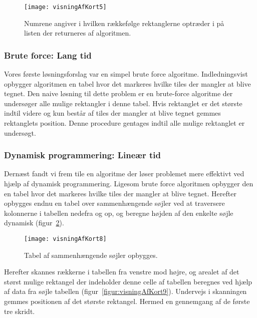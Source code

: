 \begin{figure}[h]
	\centering
	\texttt{[image: visningAfKort5]}
	\captionsetup{width=0.8\textwidth}
	\caption{Numrene angiver i hvilken rækkefølge rektanglerne optræder i på listen der returneres af algoritmen.}
	\label{figur:visningAfKort5}
\end{figure}

\subsubsection{Brute force: Lang tid}
\label{subsec:bruteForce}

Vores første løsningsforslag var en simpel brute force algoritme. Indledningsvist opbygger algoritmen en tabel hvor det markeres hvilke tiles der mangler at blive tegnet. Den naive løsning til dette problem er en brute-force algoritme der undersøger alle mulige rektangler i denne tabel. Hvis rektanglet er det største indtil videre og kun består af tiles der mangler at blive tegnet gemmes rektanglets position. Denne procedure gentages indtil alle mulige rektanglet er undersøgt.

\subsubsection{Dynamisk programmering: Lineær tid}
\label{subsec:dynamiskProgrammering}

Dernæst fandt vi frem tile en algoritme der løser problemet mere effektivt ved hjælp af dynamisk programmering. Ligesom brute force algoritmen opbygger den en tabel hvor det markeres hvilke tiles der mangler at blive tegnet. Herefter opbygges endnu en tabel over sammenhængende søjler ved at traversere kolonnerne i tabellen nedefra og op, og beregne højden af den enkelte søjle dynamisk (figur~\ref{figur:visningAfKort8}).

\begin{figure}[h]
	\centering
	\texttt{[image: visningAfKort8]}
	\captionsetup{width=0.8\textwidth}
	\caption{Tabel af sammenhængende søjler opbygges.}
	\label{figur:visningAfKort8}
\end{figure}

Herefter skannes rækkerne i tabellen fra venstre mod højre, og arealet af det størst mulige rektangel der indeholder denne celle af tabellen beregnes ved hjælp af data fra søjle tabellen (figur~\ref{figur:visningAfKort9}). Undervejs i skanningen gemmes positionen af det største rektangel. Hermed en gennemgang af de første tre skridt.

